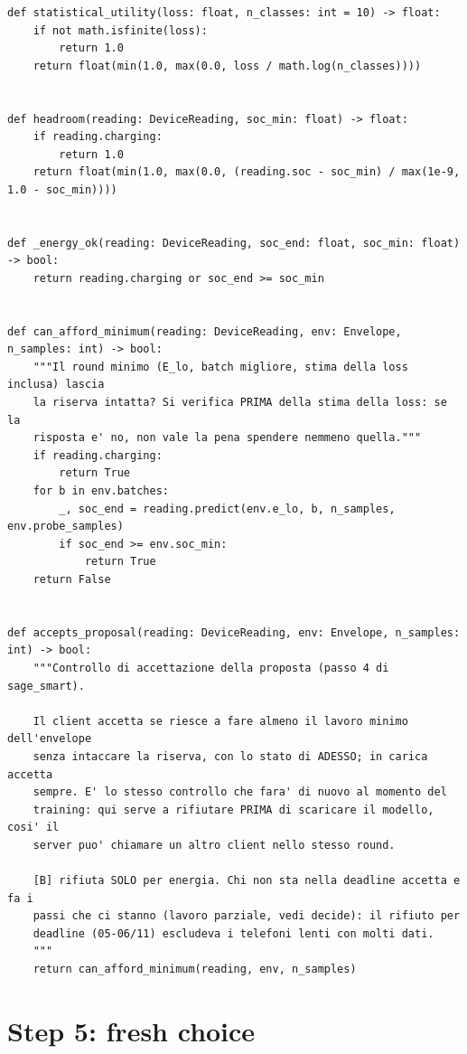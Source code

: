 \documentclass[11pt,a4paper]{article}
\begin{document}
\begin{lstlisting}[style=py,firstnumber=128,caption={\texttt{tesifl/tesiFL/client\_policy.py}, lines 128--170}]
def statistical_utility(loss: float, n_classes: int = 10) -> float:
    if not math.isfinite(loss):
        return 1.0
    return float(min(1.0, max(0.0, loss / math.log(n_classes))))


def headroom(reading: DeviceReading, soc_min: float) -> float:
    if reading.charging:
        return 1.0
    return float(min(1.0, max(0.0, (reading.soc - soc_min) / max(1e-9, 1.0 - soc_min))))


def _energy_ok(reading: DeviceReading, soc_end: float, soc_min: float) -> bool:
    return reading.charging or soc_end >= soc_min


def can_afford_minimum(reading: DeviceReading, env: Envelope, n_samples: int) -> bool:
    """Il round minimo (E_lo, batch migliore, stima della loss inclusa) lascia
    la riserva intatta? Si verifica PRIMA della stima della loss: se la
    risposta e' no, non vale la pena spendere nemmeno quella."""
    if reading.charging:
        return True
    for b in env.batches:
        _, soc_end = reading.predict(env.e_lo, b, n_samples, env.probe_samples)
        if soc_end >= env.soc_min:
            return True
    return False


def accepts_proposal(reading: DeviceReading, env: Envelope, n_samples: int) -> bool:
    """Controllo di accettazione della proposta (passo 4 di sage_smart).

    Il client accetta se riesce a fare almeno il lavoro minimo dell'envelope
    senza intaccare la riserva, con lo stato di ADESSO; in carica accetta
    sempre. E' lo stesso controllo che fara' di nuovo al momento del
    training: qui serve a rifiutare PRIMA di scaricare il modello, cosi' il
    server puo' chiamare un altro client nello stesso round.

    [B] rifiuta SOLO per energia. Chi non sta nella deadline accetta e fa i
    passi che ci stanno (lavoro parziale, vedi decide): il rifiuto per
    deadline (05-06/11) escludeva i telefoni lenti con molti dati.
    """
    return can_afford_minimum(reading, env, n_samples)
\end{lstlisting}

\newpage
\section{Step 5: fresh choice}
\label{sec:fresh}
\end{document}
